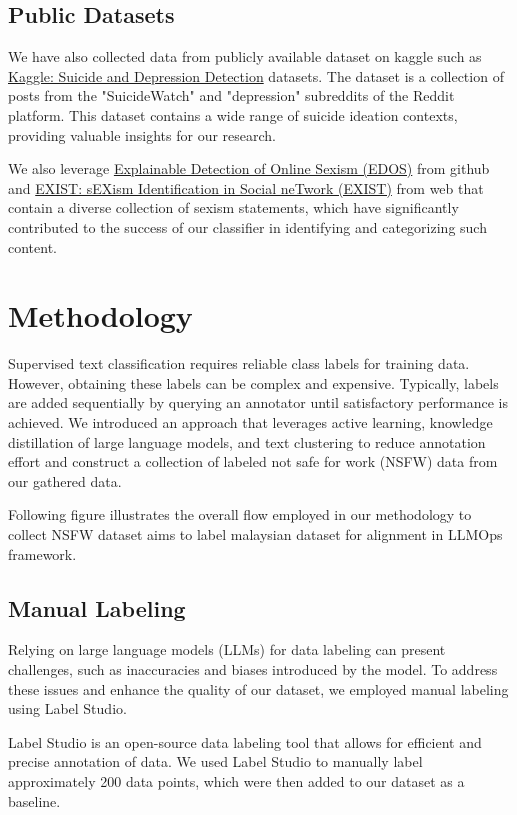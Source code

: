 \documentclass[preprint]{article}
\begin{document}
\subsection{Public Datasets}

We have also collected data from publicly available dataset on kaggle such as \href{https://www.kaggle.com/datasets/nikhileswarkomati/suicide-watch}{Kaggle: Suicide and Depression Detection} datasets. The dataset is a collection of posts from the "SuicideWatch" and "depression" subreddits of the Reddit platform. This dataset contains a wide range of suicide ideation contexts, providing valuable insights for our research.

We also leverage \href{https://github.com/rewire-online/edos}{Explainable Detection of Online Sexism (EDOS)} from github and \href{http://nlp.uned.es/exist2021/}{EXIST: sEXism Identification in Social neTwork (EXIST)} from web that contain a diverse collection of sexism statements, which have significantly contributed to the success of our classifier in identifying and categorizing such content.

\section{Methodology}

Supervised text classification requires reliable class labels for training data. However, obtaining these labels can be complex and expensive. Typically, labels are added sequentially by querying an annotator until satisfactory performance is achieved. We introduced an approach that leverages active learning, knowledge distillation of large language models, and text clustering to reduce annotation effort and construct a collection of labeled not safe for work (NSFW) data from our gathered data.

Following figure illustrates the overall flow employed in our methodology to collect NSFW dataset aims to label malaysian dataset for alignment in LLMOps framework.

\subsection{Manual Labeling}
Relying on large language models (LLMs) for data labeling can present challenges, such as inaccuracies and biases introduced by the model. To address these issues and enhance the quality of our dataset, we employed manual labeling using Label Studio.

Label Studio is an open-source data labeling tool that allows for efficient and precise annotation of data. We used Label Studio to manually label approximately 200 data points, which were then added to our dataset as a baseline.
\end{document}
